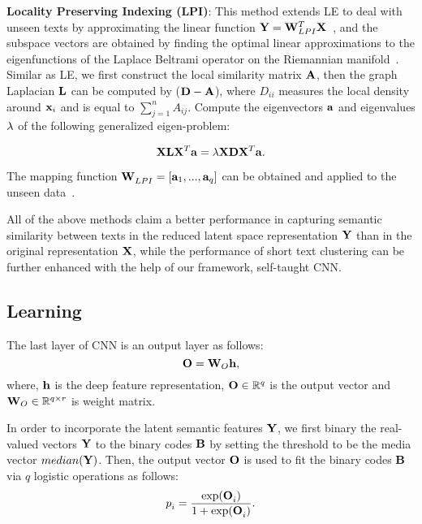 \documentclass[review]{elsarticle}
\begin{document}
{\bf{Locality Preserving Indexing (LPI)}}: This method extends LE to deal with unseen texts by approximating the linear function \({\bf{Y}} = {\bf{W}}_{LPI}^T{\bf{X}}\)~\cite{28_zhang2010self}, and the subspace vectors are obtained by finding the optimal linear approximations to the eigenfunctions of the Laplace Beltrami operator on the Riemannian manifold~\cite{niyogi2004locality}. Similar as LE, we first construct the local similarity matrix \({\bf{A}}\), then the graph Laplacian \({\bf{L}}\) can be computed by (\({\bf{D}}-{\bf{A}}\)), where \({D_{ii}} \) measures the local density around \({{\bf{x}}_{i}} \) and is equal to \( \sum\nolimits_{j = 1}^n {{A_{ij}}} \). Compute the eigenvectors \({\bf{a}}\) and eigenvalues \({\bf{\lambda }}\) of the following generalized eigen-problem:

\begin{equation}
{\bf{XL}}{{\bf{X}}^T}{\bf{a}} = {\bf{\lambda XD}}{{\bf{X}}^T}{\bf{a}}.
\end{equation}

The mapping function \({\bf{W}}_{LPI}^{} = [{{\bf{a}}_1},...,{{\bf{a}}_q}]\) can be obtained and applied to the unseen data~\cite{4_cai2005document}.

All of the above methods claim a better performance in capturing semantic similarity between texts in the reduced latent space representation \({\bf{Y}}\) than in the original representation \({\bf{X}}\), while the performance of short text clustering can be further enhanced with the help of our framework, self-taught CNN.

\subsection{Learning}
The last layer of CNN is an output layer as follows:
\begin{equation}
{{\bf{O}}} = {{\bf{W}}_O}{\bf{h}},
\label{eq:Output}
\end{equation}
where, \({\bf{h}}\) is the deep feature representation, \({\bf{O}} \in {\mathbb{R}^q}\) is the output vector and \({{\bf{W}}_O} \in {\mathbb{R}^{q \times r}}\) is weight matrix.

In order to incorporate the latent semantic features \({\bf{Y}}\), we first binary the real-valued vectors \({\bf{Y}}\) to the binary codes \({\bf{B}}\) by setting the threshold to be the media vector \(median({\bf{Y}})\). Then, the output vector \({\bf{O}}\) is used to fit the binary codes \({\bf{B}}\) via \(q\) logistic operations as follows:
\begin{equation}
p_i^{} = \frac{{\exp ({\bf{O}}_i^{})}}{{1 + \exp ({\bf{O}}_i^{})}}.
\label{eq:logistic}
\end{equation}
\end{document}
